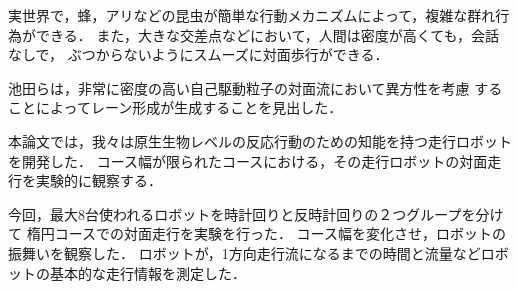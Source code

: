 実世界で，蜂，アリなどの昆虫が簡単な行動メカニズムによって，複雑な群れ行為ができる．
また，大きな交差点などにおいて，人間は密度が高くても，会話なしで，
ぶつからないようにスムーズに対面歩行ができる．

池田ら\cite{ikeda16}は，非常に密度の高い自己駆動粒子の対面流において異方性を考慮
することによってレーン形成が生成することを見出した．

本論文では，我々は原生生物レベルの反応行動のための知能を持つ走行ロボットを開発した．
コース幅が限られたコースにおける，その走行ロボットの対面走行を実験的に観察する．

今回，最大8台使われるロボットを時計回りと反時計回りの２つグループを分けて
楕円コースでの対面走行を実験を行った．
コース幅を変化させ，ロボットの振舞いを観察した．
ロボットが，1方向走行流になるまでの時間と流量などロボットの基本的な走行情報を測定した．
